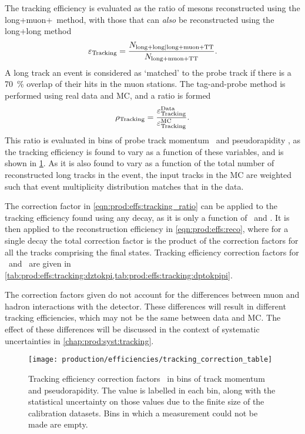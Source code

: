 The tracking efficiency is evaluated as the ratio of \PJpsi mesons 
reconstructed using the long+muon+\ttracker\ method, with those that can 
\emph{also} be reconstructed using the long+long method
\begin{equation}
  \eff_{\text{Tracking}} = 
  \frac{%
    N_{\text{long+long}|\text{long+muon+TT}}
  }{%
    N_{\text{long+muon+TT}}
  }.
  \label{eqn:prod:effs:tracking_eff}
\end{equation}
A long track an event is considered as `matched' to the probe track if there is 
a \SI{70}{\percent} overlap of their hits in the muon stations.
The tag-and-probe method is performed using real data and \ac{MC}, and a ratio 
is formed
\begin{equation}
  \efftracking = \frac{%
    \eff_{\text{Tracking}}^{\text{Data}}
  }{%
    \eff_{\text{Tracking}}^{\text{MC}}
  }.
  \label{eqn:prod:effs:tracking_ratio}
\end{equation}
This ratio is evaluated in bins of probe track momentum \ptot\ and 
pseudorapidity \Eta, as the tracking efficiency is found to vary as a function 
of these variables, and is shown in \cref{fig:prod:effs:tracking_table}.
As it is also found to vary as a function of the total number of reconstructed 
long tracks in the event, the input tracks in the \ac{MC} are weighted such 
that event multiplicity distribution matches that in the data.

The correction factor in \cref{eqn:prod:effs:tracking_ratio} can be applied to 
the tracking efficiency found using any decay, as it is only a function of 
\ptot\ and \Eta.
It is then applied to the reconstruction efficiency in 
\cref{eqn:prod:effs:reco}, where for a single decay the total correction factor 
is the product of the correction factors for all the tracks comprising the 
final states.
Tracking efficiency correction factors for \DzToKpi\ and \DpToKpipi\ are given 
in \cref{tab:prod:effs:tracking:dztokpi,tab:prod:effs:tracking:dptokpipi}.

The correction factors given do not account for the differences between muon 
and hadron interactions with the detector.
These differences will result in different tracking efficiencies, which may not 
be the same between data and \ac{MC}.
The effect of these differences will be discussed in the context of systematic 
uncertainties in \cref{chap:prod:syst:tracking}.

\begin{figure}
  \centering
  \texttt{[image: production/efficiencies/tracking\_correction\_table]}
  \caption{%
    Tracking efficiency correction factors \efftracking\ in bins of track 
    momentum and pseudorapidity.
    The value is labelled in each bin, along with the statistical uncertainty 
    on those values due to the finite size of the calibration datasets.
    Bins in which a measurement could not be made are empty.
  }
  \label{fig:prod:effs:tracking_table}
\end{figure}


